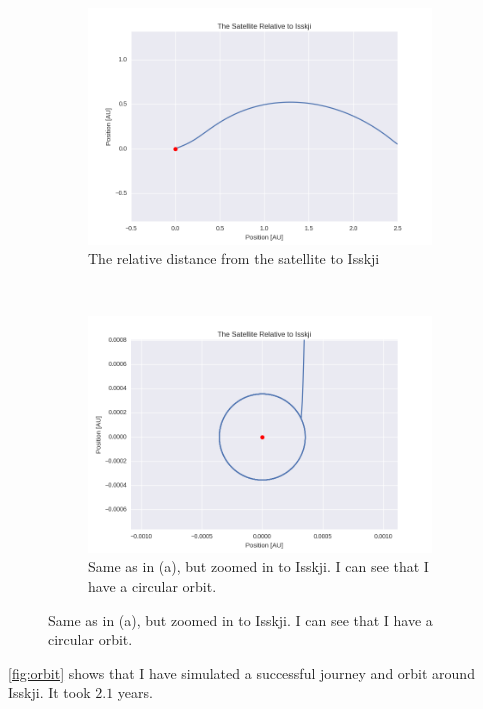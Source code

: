 \documentclass[a4paper, 10pt]{article}
\begin{document}
\begin{figure}[H]\label{fig:orbit}
\centering
\begin{subfigure}[t]{0.5\textwidth}
\centering
\includegraphics[width=\textwidth]{part3relDist.png}
\caption{The relative distance from the satellite to Isskji}
\end{subfigure}%
~
\begin{subfigure}[t]{0.5\textwidth}
\centering
\includegraphics[width=\textwidth]{part3relDistClose.png}
\caption{Same as in (a), but zoomed in to Isskji. I can see that I have a circular orbit.}
\end{subfigure}%
\end{figure}

\ref{fig:orbit} shows that I have simulated a successful journey and orbit around Isskji. It took $2.1$ years.\\
\end{document}
